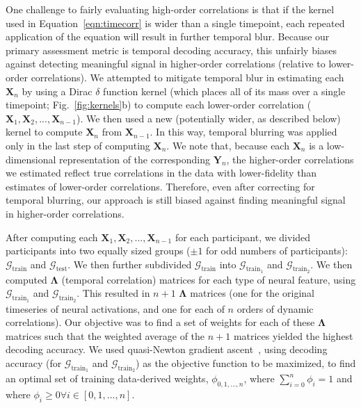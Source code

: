 \documentclass[english]{article}
\providecommand{\DIFaddtex}[1]{{\protect\color{blue}\uwave{#1}}} %
\providecommand{\DIFaddbegin}{} %
\providecommand{\DIFaddend}{} %
\providecommand{\DIFadd}[1]{\texorpdfstring{\DIFaddtex{#1}}{#1}} %
\newcommand{\DIFaddincludegraphics}[2][]{{\color{blue}\fbox{\DIFOincludegraphics[#1]{#2}}}} %
\DeclareRobustCommand{\DIFaddbegin}{\DIFOaddbegin \let\includegraphics\DIFaddincludegraphics} %
\DeclareRobustCommand{\DIFaddend}{\DIFOaddend \let\includegraphics\DIFOincludegraphics} %
\begin{document}
\DIFaddend One challenge to fairly evaluating high-order correlations is that if
the kernel used in Equation~\ref{eqn:timecorr} is wider than a single
timepoint, each repeated application of the equation will result in
further temporal blur.  Because our primary assessment metric is
temporal decoding accuracy, this unfairly biases against detecting
meaningful signal in higher-order correlations (relative to
lower-order correlations).  We attempted to mitigate temporal blur in
estimating each $\mathbf{X}_n$ by using a Dirac $\delta$ function
kernel (which places all of its mass over a single timepoint;
Fig.~\ref{fig:kernels}b\DIFaddbegin \DIFadd{, \ref{fig:pipeline}a}\DIFaddend ) to compute each lower-order correlation
($\mathbf{X}_1, \mathbf{X}_2, ..., \mathbf{X}_{n-1}$).  We then used a
new (potentially wider, as described below) kernel to compute
$\mathbf{X}_{n}$ from $\mathbf{X}_{n-1}$.  In this way, temporal
blurring was applied only in the last step of computing
$\mathbf{X}_n$.  We note that, because each $\mathbf{X}_n$ is a
low-dimensional representation of the corresponding $\mathbf{Y}_n$,
the higher-order correlations we estimated reflect true correlations
in the data with lower-fidelity than estimates of lower-order
correlations.  Therefore, even after correcting for temporal blurring,
our approach is still biased against finding meaningful signal in
higher-order correlations.

After computing each
$\mathbf{X}_1, \mathbf{X}_2, ..., \mathbf{X}_{n-1}$ for each
participant, we divided participants into two equally sized groups
($\pm 1$ for odd numbers of participants):
$\mathcal{G}_{\mathrm{train}}$ and $\mathcal{G}_{\mathrm{test}}$.  We
then further subdivided $\mathcal{G}_{\mathrm{train}}$ into
$\mathcal{G}_{\mathrm{train}_1}$ and $\mathcal{G}_{\mathrm{train}_2}$.
We then computed $\mathbf{\Lambda}$ (temporal correlation) matrices
for each type of neural feature, using
$\mathcal{G}_{\mathrm{train}_1}$ and $\mathcal{G}_{\mathrm{train}_2}$.
This resulted in $n+1$ $\mathbf{\Lambda}$ matrices (one for the
original timeseries of neural activations, and one for each of $n$
orders of dynamic correlations).  Our objective was to find a set of
weights for each of these $\mathbf{\Lambda}$ matrices such that the
weighted average of the $n+1$ matrices yielded the highest decoding
accuracy.  We used quasi-Newton gradient ascent~\citep{NoceWrig06},
using decoding accuracy (for $\mathcal{G}_{\mathrm{train}_1}$ and
$\mathcal{G}_{\mathrm{train}_2}$) as the objective function to be
maximized, to find an optimal set of training data-derived weights,
$\phi_{0, 1, ..., n}$, where $\sum_{i=0}^n \phi_i = 1$ and where
$\phi_i \geq 0 \forall i \in \left[0, 1, ..., n\right]$.
\end{document}
